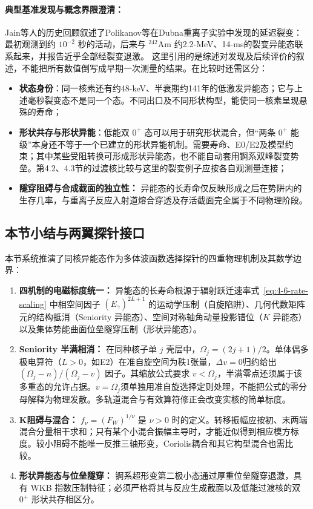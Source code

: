 \paragraph{典型基准发现与概念界限澄清：}
Jain等人的历史回顾叙述了Polikanov等在Dubna重离子实验中发现的延迟裂变：最初观测到约 $10^{-2}$ 秒的活动，后来与 $^{242}\mathrm{Am}$ 约2.2-MeV、14-ms的裂变异能态联系起来，并报告近乎全部经裂变退激。\cite{book-jain-nuclear-isomers} 这里引用的是综述对发现及后续评价的叙述，不能把所有数值倒写成早期一次测量的结果。在比较时还需区分：
\begin{itemize}
\item \textbf{状态身份}：同一核素还有约48-keV、半衰期约141年的低激发异能态；它与上述毫秒裂变态不是同一个态。不同出口及不同形状构型，能使同一核素呈现悬殊的寿命；
\item \textbf{形状共存与形状异能}：低能双 $0^+$ 态可以用于研究形状混合，但“两条 $0^+$ 能级”本身还不等于一个已建立的形状异能机制。需要寿命、E0/E2及模型约束；其中某些受阻转换可形成形状异能态，也不能自动套用锕系双峰裂变势垒。第4.2、4.3节的过渡核比较与这里的裂变例子应按各自观测量连接；
\item \textbf{隧穿阻碍与合成截面的独立性：} 异能态的长寿命仅反映形成之后在势阱内的生存几率，与重离子反应入射道熔合穿透及存活截面完全属于不同物理阶段。
\end{itemize}

\subsection{本节小结与两翼探针接口}\label{sec:4-6-5}

本节系统推演了同核异能态作为多体波函数选择探针的四重物理机制及其数学边界：
\begin{enumerate}
\item \textbf{四机制的电磁标度统一：} 异能态的长寿命根源于辐射跃迁速率式~\eqref{eq:4-6-rate-scaling} 中相空间因子 $(E_\gamma)^{2L+1}$ 的运动学压制（自旋陷阱）、几何代数矩阵元的结构抵消（Seniority 异能态）、空间对称轴角动量投影错位（$K$ 异能态）以及集体势能曲面位垒隧穿压制（形状异能态）。
\item \textbf{Seniority 半满相消：} 在同种核子单 $j$ 壳层中，$\Omega_j=(2j+1)/2$。单体偶多极电算符（$L>0$，如E2）在准自旋空间为秩1张量，$\Delta v=0$归约给出 $(\Omega_j-n)/(\Omega_j-v)$ 因子。其缩放公式要求 $v<\Omega_j$，半满零点还须属于该多重态的允许占据。$v=\Omega_j$须单独用准自旋选择定则处理，不能把公式的零分母解释为物理发散。多轨道混合与有效算符修正会改变实核的简单标度。
\item \textbf{K阻碍与混合：} $f_\nu=(F_W)^{1/\nu}$ 是 $\nu>0$ 时的定义。转移振幅应按初、末两端混合分量相干求和；只有某个小混合振幅主导时，才能近似得到相应模方标度。较小阻碍不能唯一反推三轴形变，Coriolis耦合和其它构型混合也需比较。
\item \textbf{形状异能态与位垒隧穿：} 锕系超形变第二极小态通过厚重位垒隧穿退激，具有 WKB 指数压制特征；必须严格将其与反应生成截面以及低能过渡核的双 $0^+$ 形状共存相区分。
\end{enumerate}

